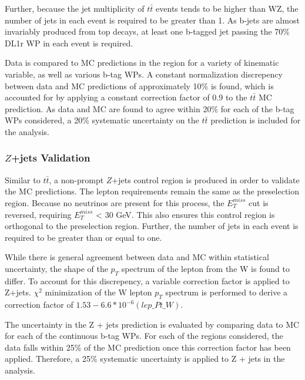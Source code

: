 Further, because the jet multiplicity of $t\bar{t}$ events tends to be higher than WZ, the number of jets in each event is required to be greater than 1. As b-jets are almost invariably produced from top decays, at least one b-tagged jet passing the 70\% DL1r WP in each event is required. 

Data is compared to MC predictions in the region for a variety of kinematic variable, as well as various b-tag WPs. A constant normalization discrepency between data and MC predictions of approximately 10\% is found, which is accounted for by applying a constant correction factor of 0.9 to the $t\bar{t}$ MC prediction. As data and MC are found to agree within 20\% for each of the b-tag WPs considered, a 20\% systematic uncertainty on the $t\bar{t}$ prediction is included for the analysis.

\subsubsection{$Z$+jets Validation}

Similar to $t\bar{t}$, a non-prompt $Z$+jets control region is produced in order to validate the MC predictions. The lepton requirements remain the same as the preselection region. Because no neutrinos are present for this process, the $E_T^{miss}$ cut is reversed, requiring $E_T^{miss}$ < 30 GeV. This also ensures this control region is orthogonal to the preselection region. Further, the number of jets in each event is required to be greater than or equal to one.

While there is general agreement between data and MC within statistical uncertainty, the shape of the $p_T$ spectrum of the lepton from the W is found to differ. To account for this discrepency, a variable correction factor is applied to Z+jets. $\chi^2$ minimization of the W lepton $p_T$ spectrum is performed to derive a correction factor of $1.53 - 6.6*10^{-6} (lep\_Pt\_W)$. 

The uncertainty in the Z + jets prediction is evaluated by comparing data to MC for each of the continuous b-tag WPs. For each of the regions considered, the data falls within 25\% of the MC prediction once this correction factor has been applied. Therefore, a 25\% systematic uncertainty is applied to Z + jets in the analysis.

